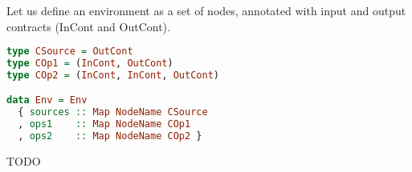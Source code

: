 Let us define an environment as a set of nodes, annotated with input and output contracts (InCont and OutCont).

\begin{lstlisting}[language=Haskell]
type CSource = OutCont
type COp1 = (InCont, OutCont)
type COp2 = (InCont, InCont, OutCont)

data Env = Env
  { sources :: Map NodeName CSource
  , ops1    :: Map NodeName COp1
  , ops2    :: Map NodeName COp2 }
\end{lstlisting}


TODO








